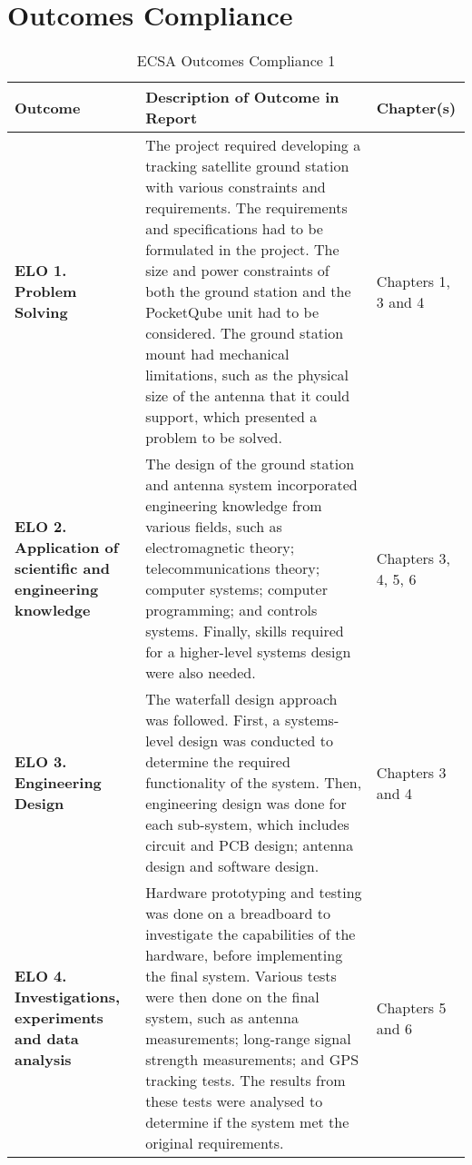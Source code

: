 \chapter{Outcomes Compliance}
\begin{table}[!htb]
  \centering
  \renewcommand{\arraystretch}{1.2}
  \begin{tabular}{ |p{4cm}|p{8cm}|p{3cm}| }
  \hline
  \textbf{Outcome}        & \textbf{Description of Outcome in Report}     & \textbf{Chapter(s)} \\
  \hline
  \textbf{ELO 1. Problem Solving} &
  The project required developing a tracking satellite ground station with various constraints and requirements. The requirements and specifications had to be formulated in the project. The size and power constraints of both the ground station and the PocketQube unit had to be considered. The ground station mount had mechanical limitations, such as the physical size of the antenna that it could support, which presented a problem to be solved. &
  Chapters 1, 3 and 4 \\ \hline
  \textbf{ELO 2. Application of scientific and engineering knowledge} &
  The design of the ground station and antenna system incorporated engineering knowledge from various fields, such as electromagnetic theory; telecommunications theory; computer systems; computer programming; and controls systems. Finally, skills required for a higher-level systems design were also needed. &
  Chapters 3, 4, 5, 6 \\ \hline
  \textbf{ELO 3. Engineering Design} &
  The waterfall design approach was followed. First, a systems-level design was conducted to determine the required functionality of the system. Then, engineering design was done for each sub-system, which includes circuit and PCB design; antenna design and software design.  &
  Chapters 3 and 4 \\ \hline
  \textbf{ELO 4. Investigations, experiments and data analysis} &
  Hardware prototyping and testing was done on a breadboard to investigate the capabilities of the hardware, before implementing the final system. Various tests were then done on the final system, such as antenna measurements; long-range signal strength measurements; and GPS tracking tests. The results from these tests were analysed to determine if the system met the original requirements. &
  Chapters 5 and 6 \\ \hline
  \end{tabular}
  \caption{ECSA Outcomes Compliance 1}
  \label{tab:outcomesCompliance1}
\end{table}

